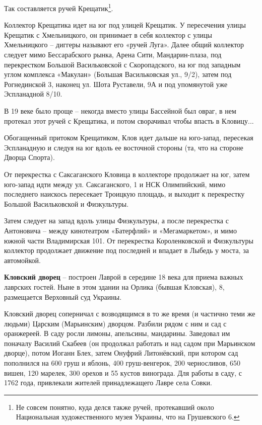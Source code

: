Так составляется ручей Крещатик\footnote{Не совсем понятно, куда делся также ручей, протекавший около Национальная художественного музея Украины, что на Грушевского 6.}. 

Коллектор Крещатика идет на юг под улицей Крещатик. У пересечения улицы Крещатик с Хмельницкого, он принимает в себя коллектор с улицы Хмельницкого – диггеры называют его «ручей Луга». Далее общий коллектор следует мимо Бессарабского рынка, Арена Сити, Мандар\-ин-плаза, под перекрестком Большой Васильковской с Скоропадского, на юг под западным углом комплекса «Макулан» (Большая Васильковская ул., 9/2), затем под Рогнединской 3, наконец ул. Шота Руставели, 9А и под упомянутой уже Эспланадной 8/10.

В 19 веке было проще – некогда вместо улицы Бассейной был овраг, в нем протекал этот ручей с Крещатика, и потом сворачивал чтобы впасть в Кловицу...

Обогащенный притоком Крещатиком, Клов идет дальше на юго-запад, пересекая Эспланадную и следуя на юг вдоль ее восточной стороны (та, что на стороне Дворца Спорта).

От перекрестка с Саксаганского Кловица в коллекторе продолжает на юг, затем юго-запад идти между ул. Саксаганского, 1 и НСК Олимпийский, мимо последнего наискось пересекает Троицкую площадь, и выходит к перекрестку Большой Васильковской и Физкультуры.

Затем следует на запад вдоль улицы Физкультуры, а после перекрестка с Антоновича – между кинотеатром «Батерфляй» и «Мегамаркетом», и мимо южной части Владимирская 101. От перекрестка Короленковской и Физкультуры коллектор продолжает движение под последней и впадает в Лыбедь у моста, за автомойкой.\\ 

\medskip


\textbf{Кловский дворец} – построен Лаврой в середине 18 века для приема важных лаврских гостей. Ныне в этом здании на Орлика (бывшая Кловская), 8, размещается Верховный суд Украины. 

Кловский дворец соперничал с возводящимся в то же время (и частично теми же людьми) Царским (Марьинским) дворцом. Разбили рядом с ним и сад с оранжереей. В саду росли лимоны, апельсины, мандарины. Заведовал им поначалу Василий Скабеев (он продолжал работать и над садом при Марьинском дворце), потом Иоганн Блех, затем Онуфрий Литонёвский, при котором сад пополнился на 600 груш и яблонь, 400 груш-венгерок, 200 черносливов, 650 вишен, 120 марелек, 300 орехов и 55 кустов винограда. Для работы в саду, с 1762 года, привлекали жителей принадлежащего Лавре села Совки.

